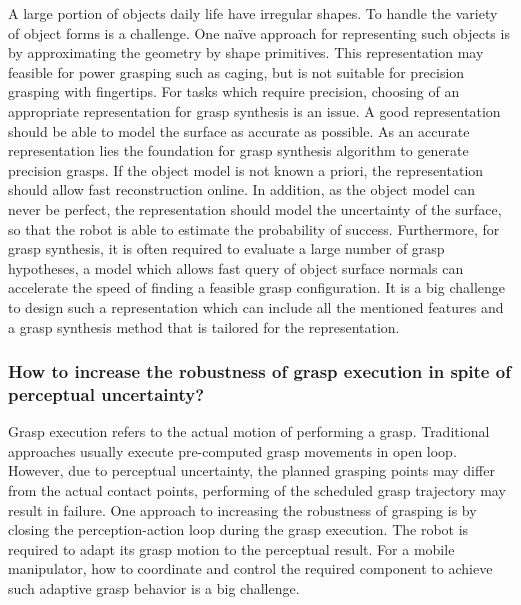 A large portion of objects daily life have irregular shapes. To handle the variety of object forms is a challenge. One na\"ive approach for representing such objects is by approximating the geometry by  shape primitives. This representation may feasible for power grasping such as caging, but is not suitable for precision grasping with fingertips. For tasks which require precision, choosing of an appropriate representation for grasp synthesis is an issue. A good representation should be able to model the surface as accurate as possible. As an accurate representation lies the foundation for grasp synthesis algorithm to generate precision grasps. If the object model is not known a priori, the representation should allow fast reconstruction online. In addition, as the object model can never be perfect, the representation should model the uncertainty of the surface, so that the robot is able to estimate the probability of success. Furthermore, for grasp synthesis, it is often required to evaluate a large number of grasp hypotheses,  a model which allows fast query of object surface normals can accelerate the speed of finding a feasible grasp configuration. It is a big challenge to design such a representation which can include all the mentioned features and a grasp synthesis method that is tailored for the representation. 

\subsubsection{How to increase the robustness of grasp execution in spite of perceptual uncertainty?}
Grasp execution refers to the actual motion of performing a grasp. Traditional approaches usually execute pre-computed grasp movements in open loop. However, due to perceptual uncertainty, the planned grasping points may differ from the actual contact points, performing of the scheduled grasp trajectory may result in failure. One approach to increasing the robustness of grasping is by closing the perception-action loop during the grasp execution. The robot is required to adapt its grasp motion to the perceptual result. For a mobile manipulator, how to coordinate and control the required component to achieve such adaptive grasp behavior is a big challenge.   


